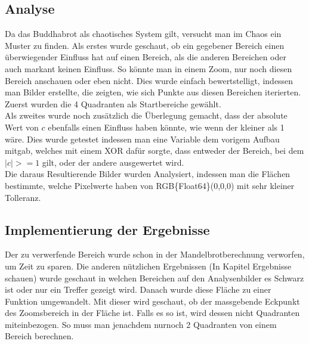 \subsection{Analyse}
Da das Buddhabrot als chaotisches System gilt, versucht man im Chaos ein Muster zu finden. Als erstes wurde geschaut, ob ein gegebener Bereich einen überwiegender Einfluss hat auf einen Bereich, als die anderen Bereichen oder auch markant keinen Einfluss. So könnte man in einem Zoom, nur noch diesen Bereich anschauen oder eben nicht. Dies wurde einfach bewertstelligt, indessen man Bilder erstellte, die zeigten, wie sich Punkte aus diesen Bereichen iterierten. Zuerst wurden die 4 Quadranten als Startbereiche gewählt.
\\
Als zweites wurde noch zusätzlich die Überlegung gemacht, dass der absolute Wert von $c$ ebenfalls einen Einfluss haben könnte, wie wenn der kleiner als 1 wäre. Dies wurde getestet indessen man eine Variable dem vorigem Aufbau mitgab, welches mit einem XOR dafür sorgte, dass entweder der Bereich, bei dem $|c|>=1$ gilt, oder der andere ausgewertet wird.
\\
Die daraus Resultierende Bilder wurden Analysiert, indessen man die Flächen bestimmte, welche Pixelwerte haben von RGB\{Float64\}(0,0,0) mit sehr kleiner Tolleranz.
\subsection{Implementierung der Ergebnisse}
Der zu verwerfende Bereich wurde schon in der Mandelbrotberechnung verworfen, um Zeit zu sparen. Die anderen nützlichen Ergebnissen (In Kapitel Ergebnisse schauen) wurde geschaut in welchen Bereichen auf den Analysenbilder es Schwarz ist oder nur ein Treffer gezeigt wird. Danach wurde diese Fläche zu einer Funktion umgewandelt. Mit dieser wird geschaut, ob der massgebende Eckpunkt des Zoomsbereich in der Fläche ist. Falls es so ist, wird dessen nicht Quadranten miteinbezogen. So muss man jenachdem nurnoch 2 Quadranten von einem Bereich berechnen.